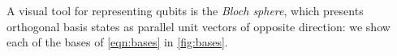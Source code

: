 {A visual tool for representing qubits is the \emph{Bloch sphere}, 
    which presents orthogonal basis states as parallel unit vectors of opposite direction:
    we show each of the bases of \cref{eqn:bases} in \cref{fig:bases}. 

\begin{figure}
    \begin{center}
        \qquad
        \qquad
\end{center}
\end{figure}}
